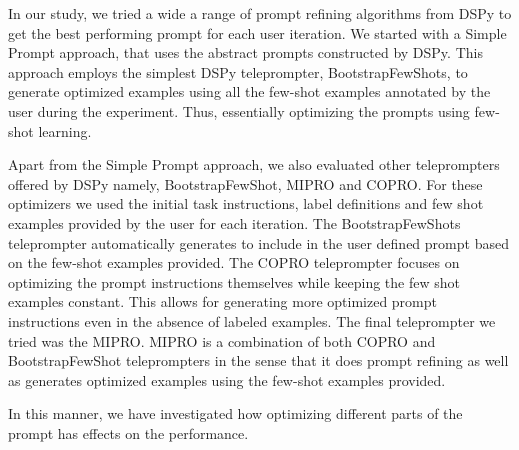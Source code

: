 





In our study, we tried a wide a range of prompt refining algorithms from DSPy to get the best performing prompt for each user iteration.
We started with a Simple Prompt approach, that uses the abstract prompts constructed by DSPy. This approach employs the simplest DSPy teleprompter, BootstrapFewShots, to generate optimized examples using all the few-shot examples annotated by the user during the experiment. Thus, essentially optimizing the prompts using few-shot learning.


Apart from the Simple Prompt approach, we also evaluated other teleprompters offered by DSPy namely, BootstrapFewShot, MIPRO and COPRO. For these optimizers we used the initial task instructions, label definitions and few shot examples provided by the user for each iteration. The BootstrapFewShots teleprompter automatically generates to include in the user defined prompt based on the few-shot examples provided. 
The COPRO teleprompter focuses on optimizing the prompt instructions themselves while keeping the few shot examples constant. This allows for generating more optimized prompt instructions even in the absence of labeled examples.
The final teleprompter we tried was the MIPRO. MIPRO is a combination of both COPRO and BootstrapFewShot teleprompters in the sense that it does prompt refining as well as generates optimized examples using the few-shot examples provided. 




In this manner, we have investigated how optimizing different parts of the prompt has effects on the performance.